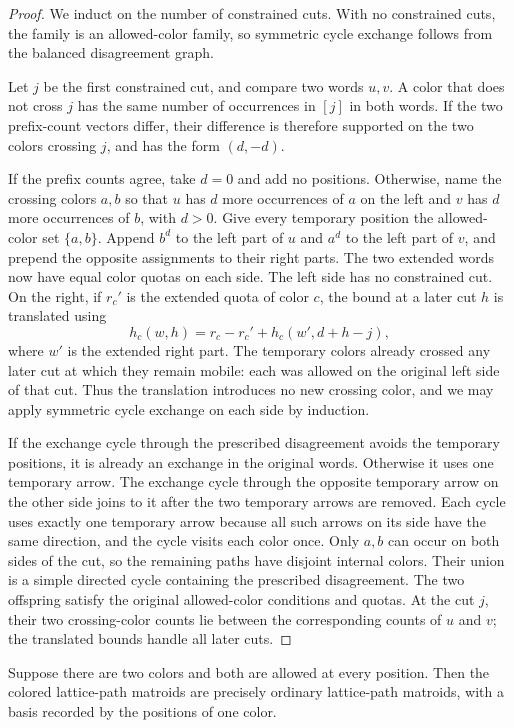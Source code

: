 \begin{proof}
We induct on the number of constrained cuts. With no constrained cuts, the
family is an allowed-color family, so symmetric cycle exchange follows from
the balanced disagreement graph.

Let $j$ be the first constrained cut, and compare two words $u,v$. A color
that does not cross $j$ has the same number of occurrences in $[j]$ in both
words. If the two prefix-count vectors differ, their difference is therefore
supported on the two colors crossing $j$, and has the form $(d,-d)$.

If the prefix counts agree, take $d=0$ and add no positions. Otherwise, name
the crossing colors $a,b$ so that $u$ has $d$ more occurrences of $a$ on the
left and $v$ has $d$ more occurrences of $b$, with $d>0$. Give every
temporary position the allowed-color set $\{a,b\}$. Append $b^d$ to the left
part of $u$ and $a^d$ to the left part of $v$, and prepend the opposite
assignments to their right parts. The two extended words now have equal color
quotas on each side.
The left side has no constrained cut. On the right, if $r_c'$ is the extended
quota of color $c$, the bound at a later cut $h$ is translated using
\[
 h_c(w,h)=r_c-r_c'+h_c(w',d+h-j),
\]
where $w'$ is the extended right part. The temporary colors already crossed
any later cut at which they remain mobile: each was allowed on the original
left side of that cut. Thus the translation introduces no new crossing color,
and we may apply symmetric cycle exchange on each side by induction.

If the exchange cycle through the prescribed disagreement avoids the
temporary positions, it is already an exchange in the original words.
Otherwise it uses one temporary arrow. The exchange cycle through the
opposite temporary arrow on the other side joins to it after the two
temporary arrows are removed. Each cycle uses exactly one temporary arrow
because all such arrows on its side have the same direction, and the cycle
visits each color once. Only $a,b$ can occur on both sides of the cut,
so the remaining paths have disjoint internal colors. Their union is a
simple directed cycle containing the prescribed disagreement. The two offspring
satisfy the original allowed-color conditions and quotas. At the cut $j$, their two
crossing-color counts lie between the corresponding counts of $u$ and $v$;
the translated bounds handle all later cuts.
\end{proof}

\begin{proposition}
Suppose there are two colors and both are allowed at every position. Then the
colored lattice-path matroids are precisely ordinary lattice-path matroids,
with a basis recorded by the positions of one color.
\end{proposition}

